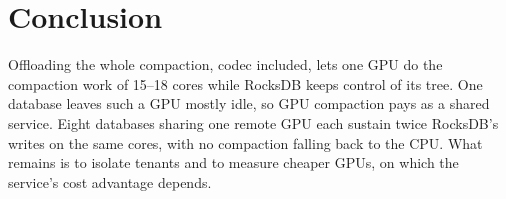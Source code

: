 \documentclass[sigconf, nonacm]{acmart}
\begin{document}
\section{Conclusion}
\label{sec:conclusion}
Offloading the whole compaction, codec included, lets one GPU do the compaction work of
15--18 cores while RocksDB keeps control of its tree. One database leaves such a GPU mostly
idle, so GPU compaction pays as a shared service. Eight databases sharing one remote GPU each
sustain twice RocksDB's writes on the same cores, with no compaction falling back to the CPU.
What remains is to isolate tenants and to measure cheaper GPUs, on which the service's cost
advantage depends.



\end{document}
